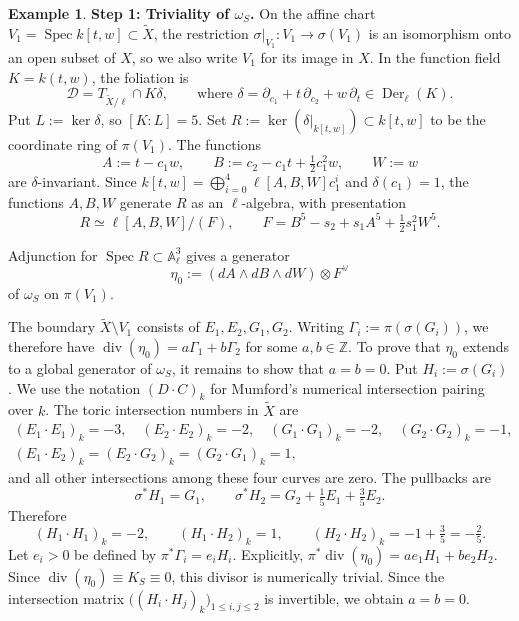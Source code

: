 \documentclass[10pt,abstract=true]{scrartcl}
\numberwithin{equation}{section}
\theoremstyle{definition}
\newtheorem{example}[theorem]{Example}
\theoremstyle{remark}
\begin{document}
\begin{example}
  \par\smallskip
  \noindent\textbf{Step 1: Triviality of $\omega_S$.}
  On the affine chart \(V_1=\operatorname{Spec}k[t,w]\subset\widetilde X\), the restriction \(\sigma|_{V_1}\colon V_1\to\sigma(V_1)\) is an isomorphism onto an open subset of \(X\), so we also write \(V_1\) for its image in \(X\).
  In the function field \(K=k(t,w)\), the foliation is
  \[
    \mathcal D=T_{\widetilde X/\ell}\cap K\delta,
    \qquad
    \text{where }
    \delta=\partial_{c_1}+t\,\partial_{c_2}+w\,\partial_t
    \in\operatorname{Der}_\ell(K).
  \]
  Put \(L:=\ker\delta\), so \([K:L]=5\).
  Set \(R:=\ker(\delta|_{k[t,w]}) \subset k[t,w]\) to be the coordinate ring of \(\pi(V_1)\).
  The functions
  \[
    A:=t-c_1w,\qquad
    B:=c_2-c_1t+\tfrac12 c_1^2w,\qquad
    W:=w
  \]
  are \(\delta\)-invariant.
  Since \(k[t,w]=\bigoplus_{i=0}^{4}\ell[A,B,W]c_1^i\) and \(\delta(c_1)=1\), the functions \(A,B,W\) generate \(R\) as an \(\ell\)-algebra, with presentation
  \[
    R\simeq\ell[A,B,W]/(F),\qquad
    F=B^5-s_2+s_1A^5+\tfrac12 s_1^2W^5 .
  \]

  Adjunction for \(\operatorname{Spec}R\subset\mathbb A^3_\ell\) gives a generator
  \[
    \eta_0:= (dA\wedge dB\wedge dW)\otimes F^\vee
  \]
  of \(\omega_S\) on \(\pi(V_1)\).

  The boundary \(\widetilde X\setminus V_1\) consists of \(E_1,E_2,G_1,G_2\).
  Writing \(\Gamma_i:=\pi(\sigma(G_i))\), we therefore have \(\operatorname{div}(\eta_0)=a\Gamma_1+b\Gamma_2\) for some \(a,b\in\mathbb Z\).
  To prove that \(\eta_0\) extends to a global generator of \(\omega_S\), it remains to show that \(a=b=0\).
  Put \(H_i:=\sigma(G_i)\).
  We use the notation \((D\cdot C)_k\) for Mumford's numerical intersection pairing over \(k\).
  The toric intersection numbers in $\widetilde X$ are
  \[
    \begin{gathered}
      (E_1\cdot E_1)_k=-3,\quad (E_2\cdot E_2)_k=-2,\quad
      (G_1\cdot G_1)_k=-2,\quad (G_2\cdot G_2)_k=-1,\\
      (E_1\cdot E_2)_k=(E_2\cdot G_2)_k=(G_2\cdot G_1)_k=1,
    \end{gathered}
  \]
  and all other intersections among these four curves are zero.
  The pullbacks are
  \[
    \sigma^*H_1=G_1,\qquad
    \sigma^*H_2=G_2+\tfrac15E_1+\tfrac35E_2.
  \]
  Therefore
  \[
    (H_1\cdot H_1)_k=-2,\qquad (H_1\cdot H_2)_k=1,\qquad
    (H_2\cdot H_2)_k=-1+\tfrac35=-\tfrac25.
  \]
  Let \(e_i>0\) be defined by \(\pi^*\Gamma_i=e_iH_i\).
  Explicitly, $\pi^*\operatorname{div}(\eta_0)=ae_1H_1+be_2H_2$.
  Since \(\operatorname{div}(\eta_0)\equiv K_S\equiv0\), this divisor is numerically trivial. 
  Since the intersection matrix
  \(\bigl((H_i\cdot H_j)_k\bigr)_{1\le i,j\le2}\) is invertible, we obtain \(a=b=0\).


\end{example}
\end{document}

